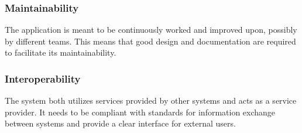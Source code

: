 \subsubsection{Maintainability}
The application is meant to be continuously worked and improved upon, possibly by different teams. This means that good design and documentation are required to facilitate its maintainability.

\subsubsection{Interoperability}
The system both utilizes services provided by other systems and acts as a service provider. It needs to be compliant with standards for information exchange between systems and provide a clear interface for external users.
